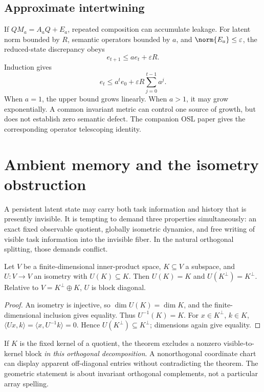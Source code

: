 \documentclass[11pt]{article}
\begin{document}
\subsection{Approximate intertwining}
If \(QM_a=A_aQ+E_a\), repeated composition can accumulate leakage. For latent norm bounded by \(R\), semantic operators bounded by \(a\), and \(\norm{E_a}\le\varepsilon\), the reduced-state discrepancy obeys
\[
 e_{t+1}\le a e_t+\varepsilon R.
\]
Induction gives
\[
 e_t\le a^t e_0+\varepsilon R\sum_{j=0}^{t-1}a^j.
\]
When \(a=1\), the upper bound grows linearly. When \(a>1\), it may grow exponentially. A common invariant metric can control one source of growth, but does not establish zero semantic defect. The companion OSL paper gives the corresponding operator telescoping identity.

\section{Ambient memory and the isometry obstruction}
A persistent latent state may carry both task information and history that is presently invisible. It is tempting to demand three properties simultaneously: an exact fixed observable quotient, globally isometric dynamics, and free writing of visible task information into the invisible fiber. In the natural orthogonal splitting, those demands conflict.

\begin{theorem}\label{thm:isometry}
Let \(V\) be a finite-dimensional inner-product space, \(K\subseteq V\) a subspace, and \(U:V\to V\) an isometry with \(U(K)\subseteq K\). Then \(U(K)=K\) and \(U(K^\perp)=K^\perp\). Relative to \(V=K^\perp\oplus K\), \(U\) is block diagonal.
\end{theorem}
\begin{proof}
An isometry is injective, so \(\dim U(K)=\dim K\), and the finite-dimensional inclusion gives equality. Thus \(U^{-1}(K)=K\). For \(x\in K^\perp\), \(k\in K\),
\(\langle Ux,k\rangle=\langle x,U^{-1}k\rangle=0\). Hence \(U(K^\perp)\subseteq K^\perp\); dimensions again give equality.
\end{proof}
If \(K\) is the fixed kernel of a quotient, the theorem excludes a nonzero visible-to-kernel block \emph{in this orthogonal decomposition}. A nonorthogonal coordinate chart can display apparent off-diagonal entries without contradicting the theorem. The geometric statement is about invariant orthogonal complements, not a particular array spelling.
\end{document}
